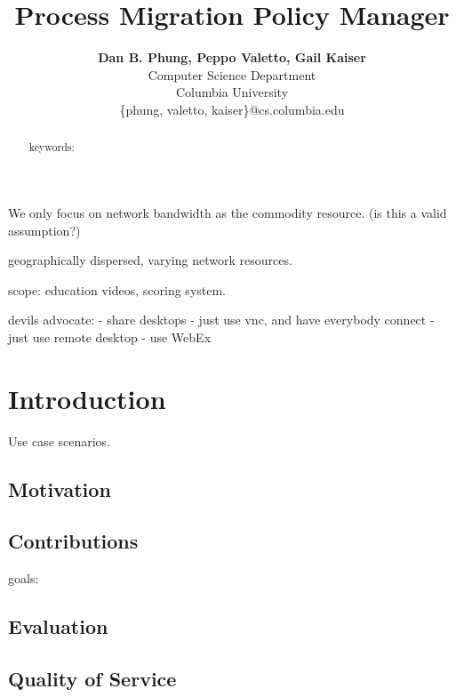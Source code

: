 \documentclass[12pt]{article}
\title{Process Migration Policy Manager}
\author{
 \textbf{Dan B. Phung, Peppo Valetto, Gail Kaiser}\\
Computer Science Department\\
Columbia University\\
\{phung, valetto, kaiser\}@cs.columbia.edu
}
\date{
\parbox[b][0ex]{0em}{\hspace*{-12.5em}\raisebox{37ex}{\fbox{For submission to 
\emph{ACM-MM 2004}, due 12:00 AM EDT: April 05, 2004.}}}}
\begin{document}
We only focus on network bandwidth as the commodity resource.
(is this a valid assumption?)

geographically dispersed, varying network resources.

scope: education videos, scoring system.

devils advocate:
- share desktops
  - just use vnc, and have everybody connect
  - just use remote desktop
  - use WebEx




\begin{singlespace}
\maketitle
\end{singlespace}

\begin{abstract}\noindent

keywords: 

\end{abstract}

\section{Introduction} \label{sec:intro}

Use case scenarios.


\subsection{Motivation} 

\subsection{Contributions} \label{sec:contrib}
goals: 

\subsection{Evaluation} \label{sec:eval}

\subsection{Quality of Service} \label{sec:qos}
\end{document}
